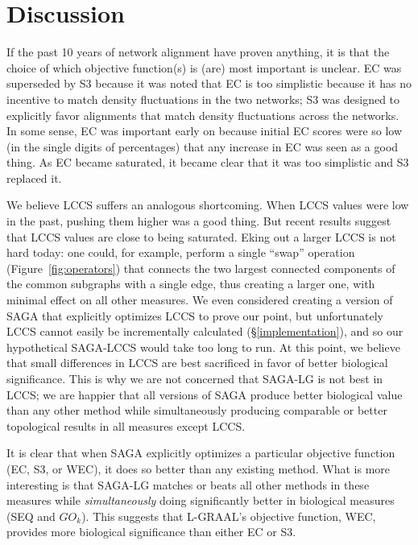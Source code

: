 \documentclass{bioinfo}
\begin{document}
\section{Discussion}

If the past 10 years of network alignment have proven anything, it is that the choice of which objective function(s) is (are) most important is unclear. EC was superseded by S3 because it was noted that EC is too simplistic because it has no incentive to match density fluctuations in the two networks; S3 was designed to explicitly favor alignments that match density fluctuations across the networks.  In some sense, EC was important early on because initial EC scores were so low (in the single digits of percentages) that any increase in EC was seen as a good thing.  As EC became saturated, it became clear that it was too simplistic and S3 replaced it.

We believe LCCS suffers an analogous shortcoming.  When LCCS values were low in the past, pushing them higher was a good thing.  But recent results suggest that LCCS values are close to being saturated. Eking out a larger LCCS is not hard today: one could, for example, perform a single ``swap'' operation (Figure~\ref{fig:operators}) that connects the two largest connected components of the common subgraphs with a single edge, thus creating a larger one, with minimal effect on all other measures. We even considered creating a version of SAGA that explicitly optimizes LCCS to prove our point, but unfortunately LCCS cannot easily be incrementally calculated (\S \ref{implementation}), and so our hypothetical SAGA-LCCS would take too long to run.  At this point, we believe that small differences in LCCS are best sacrificed in favor of better biological significance.  This is why we are not concerned that SAGA-LG is not best in LCCS; we are happier that all versions of SAGA produce better biological value than any other method while simultaneously producing comparable or better topological results in all measures except LCCS.

It is clear that when SAGA explicitly optimizes a particular objective function (EC, S3, or WEC), it does so better than any existing method. What is more interesting is that SAGA-LG matches or beats all other methods in these measures while {\em simultaneously} doing significantly better in biological measures (SEQ and $GO_k$). This suggests that L-GRAAL's objective function, WEC, provides more biological significance than either EC or S3.
\end{document}
